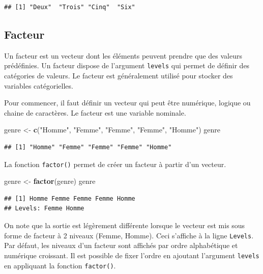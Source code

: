 \documentclass[
]{book}
\newenvironment{Shaded}{\begin{snugshade}}{\end{snugshade}}
\newcommand{\FunctionTok}[1]{\textcolor[rgb]{0.13,0.29,0.53}{\textbf{#1}}}
\newcommand{\NormalTok}[1]{#1}
\newcommand{\OtherTok}[1]{\textcolor[rgb]{0.56,0.35,0.01}{#1}}
\newcommand{\StringTok}[1]{\textcolor[rgb]{0.31,0.60,0.02}{#1}}
\begin{document}
\begin{verbatim}
## [1] "Deux"  "Trois" "Cinq"  "Six"
\end{verbatim}

\subsection{Facteur}\label{facteur}

Un facteur est un vecteur dont les éléments peuvent prendre que des valeurs prédéfinies. Un facteur dispose de l'argument \texttt{levels} qui permet de définir des catégories de valeurs. Le facteur est généralement utilisé pour stocker des variables catégorielles.

Pour commencer, il faut définir un vecteur qui peut être numérique, logique ou chaine de caractères. Le facteur est une variable nominale.

\begin{Shaded}
\begin{Highlighting}[]
\NormalTok{genre }\OtherTok{\textless{}{-}} \FunctionTok{c}\NormalTok{(}\StringTok{"Homme"}\NormalTok{, }\StringTok{"Femme"}\NormalTok{, }\StringTok{"Femme"}\NormalTok{, }\StringTok{"Femme"}\NormalTok{, }\StringTok{"Homme"}\NormalTok{)}
\NormalTok{genre}
\end{Highlighting}
\end{Shaded}

\begin{verbatim}
## [1] "Homme" "Femme" "Femme" "Femme" "Homme"
\end{verbatim}

La fonction \texttt{factor()} permet de créer un facteur à partir d'un vecteur.

\begin{Shaded}
\begin{Highlighting}[]
\NormalTok{genre }\OtherTok{\textless{}{-}} \FunctionTok{factor}\NormalTok{(genre)}
\NormalTok{genre}
\end{Highlighting}
\end{Shaded}

\begin{verbatim}
## [1] Homme Femme Femme Femme Homme
## Levels: Femme Homme
\end{verbatim}

On note que la sortie est légèrement différente lorsque le vecteur est mis sous forme de facteur à 2 niveaux (Femme, Homme). Ceci s'affiche à la ligne \texttt{Levels}. Par défaut, les niveaux d'un facteur sont affichés par ordre alphabétique et numérique croissant. Il est possible de fixer l'ordre en ajoutant l'argument \texttt{levels} en appliquant la fonction \texttt{factor()}.
\end{document}
